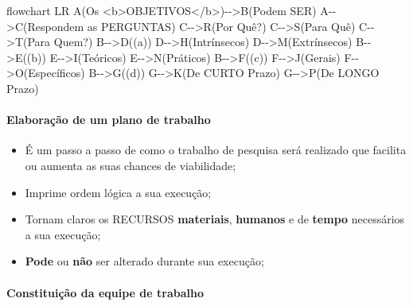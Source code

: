 \documentclass[
]{book}
\newenvironment{Shaded}{\begin{snugshade}}{\end{snugshade}}
\newcommand{\NormalTok}[1]{#1}
\providecommand{\tightlist}{%
  \setlength{\itemsep}{0pt}\setlength{\parskip}{0pt}}
\begin{document}
\begin{Shaded}
\begin{Highlighting}[]
\NormalTok{flowchart LR}
\NormalTok{A(Os \textless{}b\textgreater{}OBJETIVOS\textless{}/b\textgreater{}){-}{-}\textgreater{}B(Podem SER)}
\NormalTok{A{-}{-}\textgreater{}C(Respondem as PERGUNTAS)}
\NormalTok{C{-}{-}\textgreater{}R(Por Quê?)}
\NormalTok{C{-}{-}\textgreater{}S(Para Quê)}
\NormalTok{C{-}{-}\textgreater{}T(Para Quem?)}
\NormalTok{B{-}{-}\textgreater{}D((a))}
\NormalTok{D{-}{-}\textgreater{}H(Intrínsecos)}
\NormalTok{D{-}{-}\textgreater{}M(Extrínsecos)}
\NormalTok{B{-}{-}\textgreater{}E((b))}
\NormalTok{E{-}{-}\textgreater{}I(Teóricos)}
\NormalTok{E{-}{-}\textgreater{}N(Práticos)}
\NormalTok{B{-}{-}\textgreater{}F((c))}
\NormalTok{F{-}{-}\textgreater{}J(Gerais)}
\NormalTok{F{-}{-}\textgreater{}O(Específicos)}
\NormalTok{B{-}{-}\textgreater{}G((d))}
\NormalTok{G{-}{-}\textgreater{}K(De CURTO Prazo)}
\NormalTok{G{-}{-}\textgreater{}P(De LONGO Prazo)}
\end{Highlighting}
\end{Shaded}

\hypertarget{elaborauxe7uxe3o-de-um-plano-de-trabalho}{%
\paragraph{Elaboração de um plano de
trabalho}\label{elaborauxe7uxe3o-de-um-plano-de-trabalho}}

\begin{itemize}
\tightlist
\item
  É um passo a passo de como o trabalho de pesquisa será realizado que
  facilita ou aumenta as suas chances de viabilidade;
\item
  Imprime ordem lógica a sua execução;
\item
  Tornam claros os RECURSOS \textbf{materiais}, \textbf{humanos} e de
  \textbf{tempo} necessários a sua execução;
\item
  \textbf{Pode} ou \textbf{não} ser alterado durante sua execução;
\end{itemize}

\hypertarget{constituiuxe7uxe3o-da-equipe-de-trabalho}{%
\paragraph{Constituição da equipe de
trabalho}\label{constituiuxe7uxe3o-da-equipe-de-trabalho}}
\end{document}
